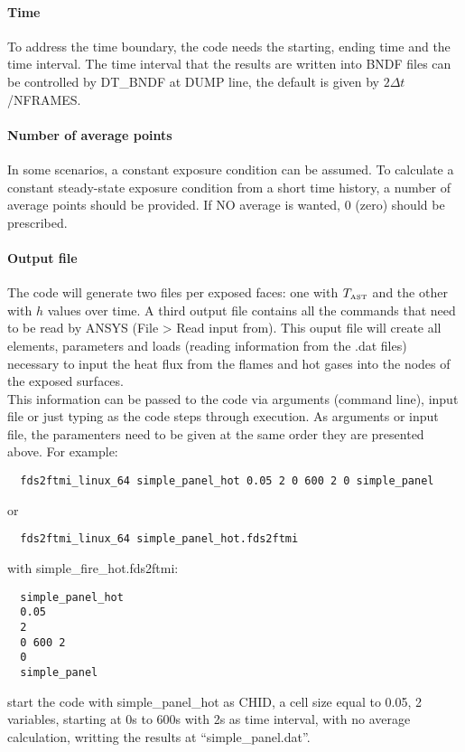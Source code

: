 \documentclass[11pt]{book}
\begin{document}
\paragraph{Time} 
To address the time boundary, the code needs the starting, ending time and the time interval. The time interval that the results are written into {\ct BNDF} files can be controlled by {\ct DT\_BNDF} at {\ct DUMP} line, the default is given by $2 \Delta t$/{\footnotesize NFRAMES}.
\paragraph{Number of average points} 
In some scenarios, a constant exposure condition can be assumed. To calculate a constant steady-state exposure condition from 
a short time history, a number of average points should be provided. If NO average is wanted, 0 (zero) should be prescribed. 
\paragraph{Output file}
The code will generate two files per exposed faces: one with $T_{\hbox{\tiny AST}}$ and the other with $h$ values over time. A third output file contains all the commands that need to be read by A{\footnotesize NSYS} (File > Read input from). This ouput file will create all elements, parameters and loads (reading information from the .dat files) necessary to input the heat flux from the flames and hot gases into the nodes of the exposed surfaces. \\

This information can be passed to the code via arguments (command line), input file or just typing as the code steps through execution. As arguments or input file, the paramenters need to be given at the same order they are presented above. For example:
\begin{verbatim}
  fds2ftmi_linux_64 simple_panel_hot 0.05 2 0 600 2 0 simple_panel
\end{verbatim}
  or 
\begin{verbatim}
  fds2ftmi_linux_64 simple_panel_hot.fds2ftmi 
\end{verbatim}
with simple\_fire\_hot.fds2ftmi:
\begin{verbatim}
  simple_panel_hot 
  0.05 
  2
  0 600 2 
  0
  simple_panel
\end{verbatim}
start the code with simple\_panel\_hot as {\ct CHID}, a cell size equal to 0.05, 2 variables, starting at 0s to 600s with 2s as time interval, with no average calculation, writting the results at ``simple\_panel.dat''.
\end{document}
